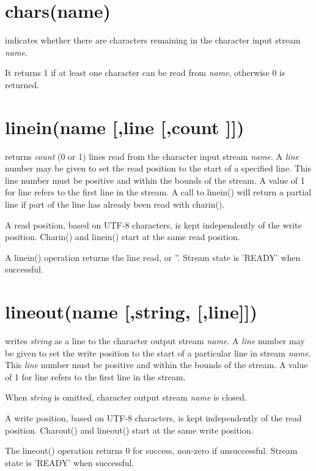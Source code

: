 \section{chars(name)}
indicates whether there are characters remaining in the character input stream
\emph{name}.

It returns 1 if at least one character can be read from \emph{name},
otherwise 0 is returned.

\section{linein(name [,line [,count {]}{]})}
returns \emph{count} (0 or 1) lines read from the character input stream \emph{name}.
A \emph{line} number may be given to set the read position to the start of a specified line. This
line number must be positive and within the bounds of the stream. A value of 1 for line refers
to the first line in the stream. A call to linein() will return a partial line
if part of the line has already been read with charin().

A read position, based on UTF-8 characters, is kept independently of the write position.
Charin() and linein() start at the same read position.

A linein() operation returns the line read, or ''. Stream state is 'READY' when successful.


\section{lineout(name [,string, [,line{]}{]})}
writes \emph{string} as a line to the character output stream \emph{name}.
A \emph{line} number may be given to set the write position to the start of a
particular line in stream \emph{name}. This \emph{line} number must be positive and
within the bounds of the stream. A value of 1 for line
refers to the first line in the stream.

When \emph{string} is omitted, character output stream \emph{name} is closed.

A write position, based on UTF-8 characters, is kept independently of the read position.
Charout() and lineout() start at the same write position.

The lineout() operation returns 0 for success, non-zero if unsuccessful. Stream state is 'READY' when successful.

